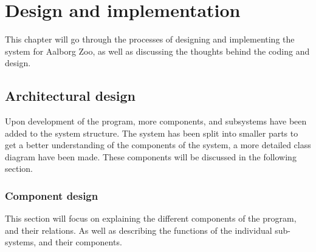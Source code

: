\chapter{Design and implementation}
This chapter will go through the processes of designing and implementing the system for Aalborg Zoo, as well as discussing the thoughts behind the coding and design.

\section{Architectural design}
Upon development of the program, more components, and subsystems have been added to the system structure. The system has been split into smaller parts to get a better understanding of the components of the system, a more detailed class diagram have been made. These components will be discussed in the following section.

\subsection{Component design}
This section will focus on explaining the different components of the program, and their relations. As well as describing the functions of the individual sub-systems, and their components.

